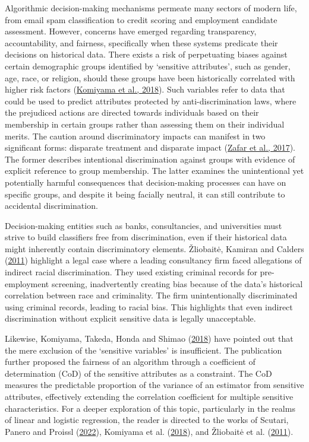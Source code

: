 \documentclass[
  11pt,
]{article}
\begin{document}
Algorithmic decision-making mechanisms permeate many sectors of modern
life, from email spam classification to credit scoring and employment
candidate assessment. However, concerns have emerged regarding
transparency, accountability, and fairness, specifically when these
systems predicate their decisions on historical data. There exists a
risk of perpetuating biases against certain demographic groups
identified by `sensitive attributes', such as gender, age, race, or
religion, should these groups have been historically correlated with
higher risk factors (\protect\hyperlink{ref-Komiyama2018}{Komiyama et
al., 2018}). Such variables refer to data that could be used to predict
attributes protected by anti-discrimination laws, where the prejudiced
actions are directed towards individuals based on their membership in
certain groups rather than assessing them on their individual merits.
The caution around discriminatory impacts can manifest in two
significant forms: disparate treatment and disparate impact
(\protect\hyperlink{ref-Zafar2017}{Zafar et al., 2017}). The former
describes intentional discrimination against groups with evidence of
explicit reference to group membership. The latter examines the
unintentional yet potentially harmful consequences that decision-making
processes can have on specific groups, and despite it being facially
neutral, it can still contribute to accidental discrimination.

Decision-making entities such as banks, consultancies, and universities
must strive to build classifiers free from discrimination, even if their
historical data might inherently contain discriminatory elements.
Žliobaitė, Kamiran and Calders
(\protect\hyperlink{ref-Zliobaite2011}{2011}) highlight a legal case
where a leading consultancy firm faced allegations of indirect racial
discrimination. They used existing criminal records for pre-employment
screening, inadvertently creating bias because of the data's historical
correlation between race and criminality. The firm unintentionally
discriminated using criminal records, leading to racial bias. This
highlights that even indirect discrimination without explicit sensitive
data is legally unacceptable.

Likewise, Komiyama, Takeda, Honda and Shimao
(\protect\hyperlink{ref-Komiyama2018}{2018}) have pointed out that the
mere exclusion of the `sensitive variables' is insufficient. The
publication further proposed the fairness of an algorithm through a
coefficient of determination (CoD) of the sensitive attributes as a
constraint. The CoD measures the predictable proportion of the variance
of an estimator from sensitive attributes, effectively extending the
correlation coefficient for multiple sensitive characteristics. For a
deeper exploration of this topic, particularly in the realms of linear
and logistic regression, the reader is directed to the works of Scutari,
Panero and Proissl (\protect\hyperlink{ref-Scutari2022}{2022}), Komiyama
et al. (\protect\hyperlink{ref-Komiyama2018}{2018}), and Žliobaitė et
al. (\protect\hyperlink{ref-Zliobaite2011}{2011}).
\end{document}
